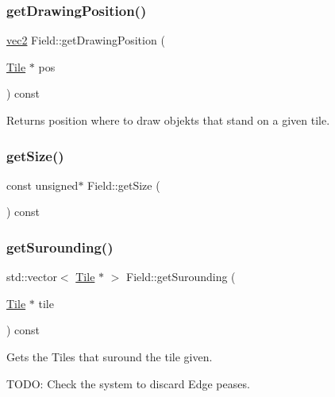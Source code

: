 \subsubsection{\texorpdfstring{get\+Drawing\+Position()}{getDrawingPosition()}}
{\footnotesize\ttfamily \hyperlink{structvec2}{vec2} Field\+::get\+Drawing\+Position (\begin{DoxyParamCaption}\item[{\hyperlink{classTile}{Tile} $\ast$}]{pos }\end{DoxyParamCaption}) const}

\begin{DoxyReturn}{Returns}
position where to draw objekts that stand on a given tile. 
\end{DoxyReturn}
\mbox{\label{classField_a6daa65acbf49cc9c9516eca76efeaec2}} 
\subsubsection{\texorpdfstring{get\+Size()}{getSize()}}
{\footnotesize\ttfamily const unsigned$\ast$ Field\+::get\+Size (\begin{DoxyParamCaption}{ }\end{DoxyParamCaption}) const\hspace{0.3cm}{\ttfamily [inline]}}

\mbox{\label{classField_a36a2c3f822ece390f7b69f528d1d8742}} 
\subsubsection{\texorpdfstring{get\+Surounding()}{getSurounding()}}
{\footnotesize\ttfamily std\+::vector$<$ \hyperlink{classTile}{Tile} $\ast$ $>$ Field\+::get\+Surounding (\begin{DoxyParamCaption}\item[{\hyperlink{classTile}{Tile} $\ast$}]{tile }\end{DoxyParamCaption}) const}

Gets the Tiles that suround the tile given.

T\+O\+DO\+: Check the system to discard Edge peases. \mbox{\label{classField_a361bc41ed73bb361ee84c390a9f9c0d0}} 
